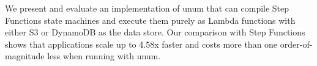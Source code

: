 \documentclass[letterpaper,twocolumn,10pt]{article}
\newcommand{\name}{unum}
\begin{document}
We present and evaluate an implementation of \name{} that can compile Step
Functions state machines and execute them purely as Lambda functions with
either S3 or DynamoDB as the data store. Our comparison with Step Functions
shows that applications scale up to 4.58x faster and costs more than one
order-of-magnitude less when running with \name{}. 





%


% 


\vspace{5in} %




\end{document}
